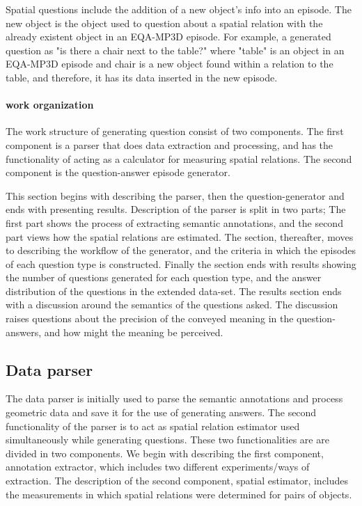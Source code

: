 Spatial questions include the addition of a new object's info into an episode. The new object is the object used to question about a spatial relation with the already existent object in an EQA-MP3D episode. For example, a generated question as "is there a chair next to the table?" where "table" is an object in an EQA-MP3D episode and chair is a new object found within a relation to the table, and therefore, it has its data inserted in the new episode.



\paragraph{work organization}

The work structure of generating question consist of two components. The first component is a parser that does data extraction and processing, and has the functionality of acting as a calculator for measuring spatial relations. The second component is the question-answer episode generator. 

 
This section begins with describing the parser, then the question-generator and ends with presenting results. Description of the parser is split in two parts; The first part shows the process of extracting semantic annotations, and the second part views how the spatial relations are estimated. The section, thereafter, moves to describing the workflow of the generator, and the criteria in which the episodes of each question type is constructed. Finally the section ends with results showing the number of questions generated for each question type, and the answer distribution of the questions in the extended data-set. The results section ends with a discussion around the semantics of the questions asked. The discussion raises questions about the precision of the conveyed meaning in the question-answers, and how might the meaning be perceived. 


\subsection{Data parser}


The data parser is initially used to parse the semantic annotations and process geometric data and save it for the use of generating answers. The second functionality of the parser is to act as spatial relation estimator used simultaneously while generating questions. These two functionalities are are divided in two components. We begin with describing the first component, annotation extractor, which includes two different experiments/ways of extraction. The description of the second component, spatial estimator, includes the measurements in which spatial relations were determined for pairs of objects. 

